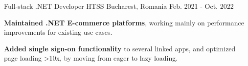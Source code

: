 \begin{cventries}
  \cventry
    {Full-stack .NET Developer} %
    {HTSS} %
    {Bucharest, Romania} %
    {Feb. 2021 - Oct. 2022} %
    {
      \begin{cvitems} %
        \item {\textbf{Maintained .NET E-commerce platforms}, working mainly on performance improvements for existing use cases.}
        \item {\textbf{Added single sign-on functionality} to several linked apps, and optimized page loading >10x, by moving from eager to lazy loading.}
      \end{cvitems}
    }

\end{cventries}
